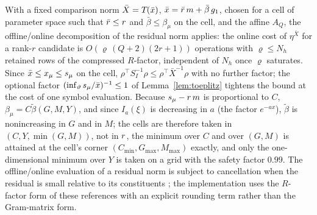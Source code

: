 \begin{remark}\label{rem:reduced-online}
With a fixed comparison norm $\bar X=T_{}(\bar{x})$, $\bar{x}=\bar r\,m+\bar\beta\,g_1$,
chosen for a cell of parameter space such that $\bar r\le r$ and $\bar\beta\le\beta_\mu$ on the cell,
and the affine $A_Q$, the offline/online decomposition of the residual norm applies: the online cost of
$\eta^{\bar X}$ for a rank-$r$ candidate is $O(\varrho\,(Q+2)(2r+1))$ operations with $\varrho\le N_h$ retained rows
of the compressed $R$-factor, independent of $N_h$ once $\varrho$ saturates.  Since
$\bar{x}\le x_\mu\le s_\mu$ on the cell, $\rho^\top S_I^{-1}\rho\le\rho^\top\bar X^{-1}\rho$ with no
further factor; the optional factor $(\inf_\vartheta s_\mu/\bar{x})^{-1}\le1$ of
Lemma~\ref{lem:toeplitz} tightens the bound at the cost of one symbol evaluation.  Because
$s_\mu-r\,m$ is proportional to $C$, $\beta_\mu=C\tilde\beta(G,M,Y)$, and since
$I_a(\xi)$ is decreasing in $a$ (the factor $e^{-ax}$), $\tilde\beta$ is nonincreasing in $G$ and in
$M$; the cells are therefore taken in $(C,Y,\min(G,M))$, not in $r$, the minimum over $C$ and over
$(G,M)$ is attained at the cell's corner $(C_{\min},G_{\max},M_{\max})$ exactly, and only the
one-dimensional minimum over $Y$ is taken on a grid with the safety factor $0.99$.  The offline/online evaluation of a residual norm is
subject to cancellation when the residual is small relative to its constituents
\cite{CasenaveErnLelievre2014,BuhrEngwerOhlbergerRave2014}; the implementation uses the
$R$-factor form of these references with an explicit rounding term rather than the Gram-matrix form.
\end{remark}
